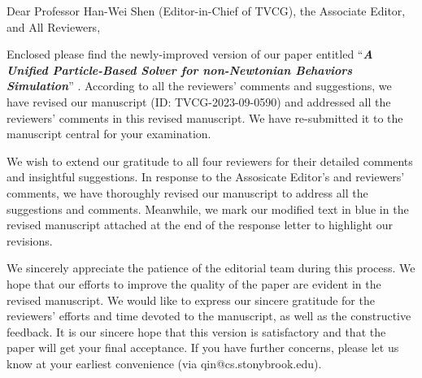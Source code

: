 \documentclass[12pt,a4paper]{article}
\begin{document}
\hspace{4in}%


\bigskip

\hspace{-\parindent}%

\noindent Dear Professor Han-Wei Shen (Editor-in-Chief of TVCG), the Associate Editor, and All Reviewers,

\bigskip

Enclosed please find the newly-improved version of our paper entitled “\textbf{\textit{A Unified Particle-Based Solver for non-Newtonian Behaviors Simulation}}” .  According to all the reviewers’ comments and suggestions, we have revised our manuscript (ID: TVCG-2023-09-0590) and addressed all the reviewers' comments in this revised manuscript. We have re-submitted it to the manuscript central for your examination.
\vspace{0.5cm}


We wish to extend our gratitude to all four reviewers for their detailed comments and insightful suggestions.
In response to the Assosicate Editor's and reviewers’ comments, we have thoroughly revised our manuscript to address all the suggestions and comments. Meanwhile, we mark our modified text in blue in the revised manuscript attached at the end of the response letter to highlight our revisions. %

\vspace{0.5cm}
We sincerely appreciate the patience of the editorial team during this process. We hope that our efforts to improve the quality of the paper are evident in the revised manuscript. We would like to express our sincere gratitude for the reviewers’ efforts and time devoted to the manuscript, as well as the constructive feedback. It is our sincere hope that this version is satisfactory and that the paper will get your final acceptance. If you have further concerns, please let us know at your earliest convenience (via qin@cs.stonybrook.edu). 
\end{document}
